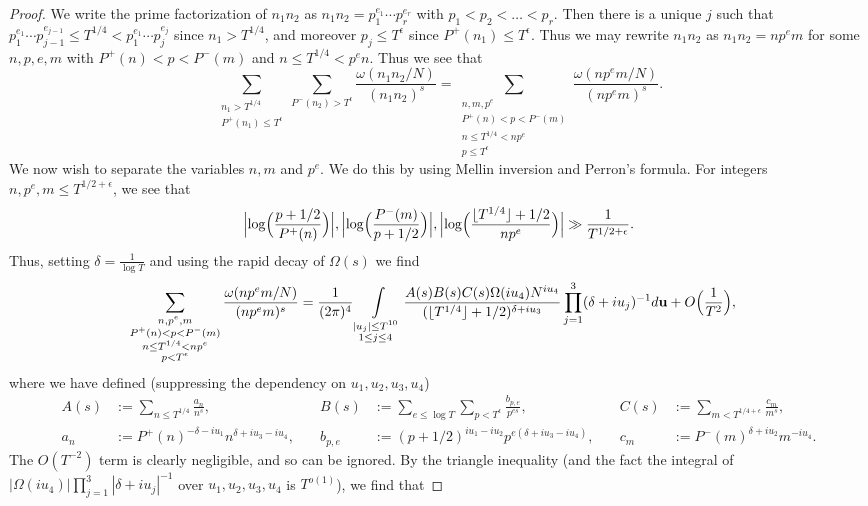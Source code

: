\documentclass[12pt]{amsart}
\theoremstyle{plain}
\theoremstyle{definition}
\theoremstyle{remark}
\begin{document}
\begin{proof}
We write the prime factorization of $n_1n_2$ as $n_1n_2=p_1^{e_1}\cdots p_r^{e_r}$ with $p_1 < p_2< \dots < p_r$. Then there is a unique $j$ such that $p_1^{e_1}\cdots p_{j-1}^{e_{j-1}}\le T^{1/4}<p_1^{e_1}\cdots p_{j}^{e_{j}}$ since $n_1>T^{1/4}$, and moreover $p_j\leq T^\epsilon$ since $P^+(n_1)\le T^\epsilon$. Thus we may rewrite $n_1n_2$ as $n_1n_2=n p^e m$ for some $n,p,e,m$ with $P^+(n)<p<P^-(m)$ and $n\le T^{1/4}<p^en$. Thus we see that
\[
\sum_{\substack{ n_1>T^{1/4}\\ P^+(n_1)\le T^\epsilon}}\sum_{P^-(n_2)>T^\epsilon}\frac{\omega(n_1n_2/N)}{(n_1n_2)^s}=\sum_{\substack{n,m,p^e\\ P^+(n)<p<P^-(m)\\ n\le T^{1/4}<n p^e\\ p\leq T^\epsilon}}\frac{\omega(n p^e m/N)}{(n p^e m)^s}.
\]
We now wish to separate the variables $n,m$ and $p^e$. We do this by using Mellin inversion and Perron's formula. For integers $n,p^e,m\leq T^{1/2+\epsilon}$, we see that 
\[
\Bigl|\log\Bigl(\frac{p+1/2}{P^+(n)}\Bigr)\Bigr|,\Bigl|\log\Bigl(\frac{P^-(m)}{p+1/2}\Bigr)\Bigr|,\Bigl|\log\Bigl(\frac{\lfloor T^{1/4}\rfloor +1/2}{n p^e}\Bigr)\Bigr|\gg \frac{1}{T^{1/2+\epsilon}}.
\]
Thus, setting $\delta = \frac{1}{\log T}$ and using the rapid decay of $\Omega(s)$ we find
\begin{align*}
&\sum_{\substack{n,p^e,m\\ P^+(n)<p<P^-(m)\\ n\le T^{1/4}<np^e\\ p<T^\epsilon}}\frac{\omega(np^em/N)}{(np^em)^{s}} = \frac{1}{(2\pi)^4}\int\limits_{\substack{|u_j|\le T^{10} \\ 1\leq j\leq 4}} \frac{A(s)B(s)C(s)\Omega(iu_4)N^{iu_4}}{(\lfloor T^{1/4}\rfloor +1/2)^{\delta + iu_3}}\prod_{j=1}^3 (\delta + iu_j)^{-1}d\textbf{u}+O\Bigl(\frac{1}{T^2}\Bigr),
\end{align*}
where we have defined (suppressing the dependency on $u_1,u_2,u_3,u_4$)
\begin{align*}
A(s)&:=\sum_{n\leq T^{1/4}}\frac{a_{n}}{n^s},\quad &B(s)&:=\sum_{e\le \log{T}}\sum_{p<T^{\epsilon}}\frac{b_{p,e}}{p^{es}},\quad &C(s)&:=\sum_{m<T^{1/4+\epsilon} }\frac{c_{m}}{m^s},\\
a_{n}&:=P^+(n)^{-\delta-i u_1}n^{\delta+ iu_3-iu_4},\quad &b_{p,e}&:=(p+1/2)^{iu_1-iu_2}p^{e(\delta+ iu_3-iu_4)},\quad &c_{m}&:=P^-(m)^{\delta+iu_2}m^{-iu_4}.
\end{align*}
The $O(T^{-2})$ term is clearly negligible, and so can be ignored. By the triangle inequality (and the fact the integral of $|\Omega(iu_4)|\prod_{j=1}^3 |\delta + iu_j|^{-1}$ over $u_1,u_2,u_3,u_4$ is $T^{o(1)}$), we find that

\end{proof}
\end{document}
